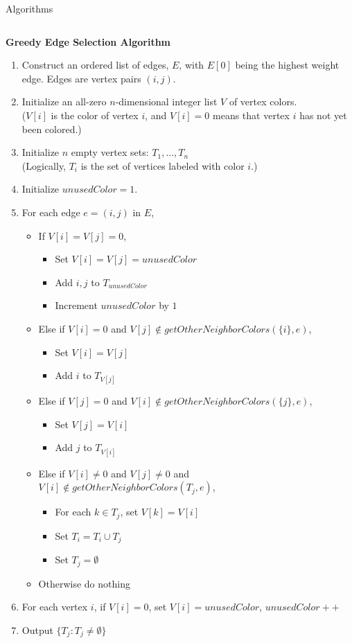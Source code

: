\documentclass[serif,mathserif,final]{beamer}
\begin{document}
\begin{frame}{}
\begin{columns}[t]
\begin{column}{0.49\linewidth}
\begin{block}{Algorithms}
\begin{columns}[t]
\begin{column}{0.49\linewidth}
\begin{framed}
\noindent\textbf{Greedy Edge Selection Algorithm}
\begin{enumerate}
\item Construct an ordered list of edges, $E$, with $E[0]$ being the highest weight edge. Edges are vertex pairs $(i,j)$.
\item Initialize an all-zero $n$-dimensional integer list $V$ of vertex colors. \\
($V[i]$ is the color of vertex $i$, and $V[i]=0$ means that vertex $i$ has not yet been colored.)
\item Initialize $n$ empty vertex sets: $T_1,...,T_n$\\
(Logically, $T_i$ is the set of vertices labeled with color $i$.)
\item Initialize $unusedColor=1$.
\item For each edge $e=(i,j)$ in $E$,
\begin{itemize}
\item If $V[i]=V[j]=0$,
\begin{itemize}
\item Set $V[i]=V[j]=unusedColor$
\item Add $i,j$ to $T_{unusedColor}$
\item Increment $unusedColor$ by $1$
\end{itemize}
\item Else if $V[i]=0$ and $V[j]\notin getOtherNeighborColors(\{i\}, e)$,
\begin{itemize}
\item Set $V[i]=V[j]$
\item Add $i$ to $T_{V[j]}$
\end{itemize}
\item Else if $V[j]=0$ and $V[i]\notin getOtherNeighborColors(\{j\}, e)$,
\begin{itemize}
\item Set $V[j]=V[i]$
\item Add $j$ to $T_{V[i]}$
\end{itemize}
\item Else if  $V[i]\neq 0$ and $V[j]\neq 0$ and $V[i]\notin getOtherNeighborColors(T_j, e)$,
\begin{itemize}
\item For each $k\in T_j$, set $V[k]=V[i]$
\item Set $T_i=T_i\cup T_j$
\item Set $T_j=\emptyset$
\end{itemize}
\item Otherwise do nothing
\end{itemize}
\item For each vertex $i$, if $V[i]=0$, set $V[i]=unusedColor$, $unusedColor++$
\item Output $\{T_j:T_j\neq\emptyset\}$
\end{enumerate}
\end{framed}


\end{column}
\end{columns}
\end{block}
\end{column}
\end{columns}
\end{frame}
\end{document}
